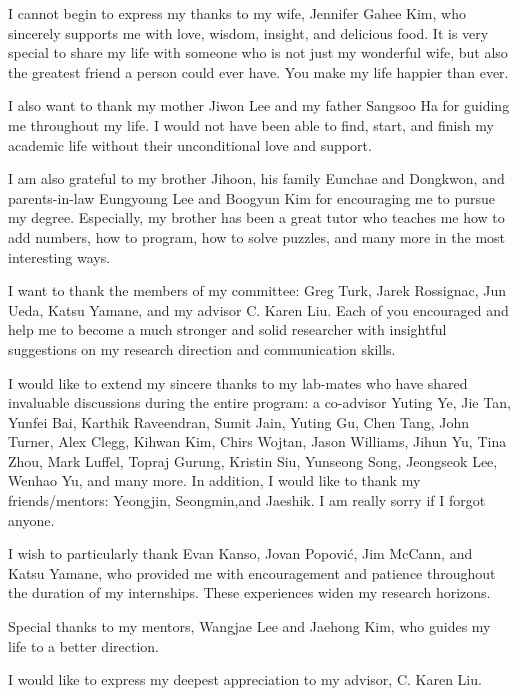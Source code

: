 I cannot begin to express my thanks to my wife, Jennifer Gahee Kim,
who sincerely supports me with love, wisdom, insight, and delicious food.
It is very special to share my life with someone who is not just my wonderful
wife, but also the greatest friend a person could ever have.
You make my life happier than ever.

I also want to thank my mother Jiwon Lee and my father Sangsoo Ha for 
guiding me throughout my life.
I would not have been able to find, start, and finish my academic life without
their unconditional love and support.

I am also grateful to my brother Jihoon, his family Eunchae and Dongkwon,
and parents-in-law Eungyoung Lee and Boogyun Kim for encouraging me to pursue
my degree.
Especially, my brother has been a great tutor who teaches me
how to add numbers, how to program, how to solve puzzles, and many more
in the most interesting ways.

I want to thank the members of my committee: Greg Turk, Jarek Rossignac,
Jun Ueda, Katsu Yamane, and my advisor C. Karen Liu.
Each of you encouraged and help me to become a much stronger and solid
researcher with insightful suggestions on my research direction and
communication skills.

I would like to extend my sincere thanks to my lab-mates
who have shared invaluable discussions during the entire program:
a co-advisor Yuting Ye, Jie Tan, Yunfei Bai, Karthik Raveendran, 
Sumit Jain, Yuting Gu, Chen Tang, John Turner, Alex Clegg, Kihwan Kim, 
Chirs Wojtan, Jason Williams, Jihun Yu, Tina Zhou, Mark Luffel, 
Topraj Gurung, Kristin Siu, Yunseong Song,
Jeongseok Lee, Wenhao Yu, and many more.
In addition, I would like to thank my friends/mentors: Yeongjin, Seongmin,and Jaeshik.
I am really sorry if I forgot anyone.

I wish to particularly thank Evan Kanso, Jovan Popovi\'{c}, Jim McCann, and
Katsu Yamane, who provided me with encouragement and patience throughout the
duration of my internships. These experiences widen my research horizons.

Special thanks to my mentors, Wangjae Lee and Jaehong Kim, who
guides my life to a better direction.

I would like to express my deepest appreciation to my advisor, C. Karen Liu.












